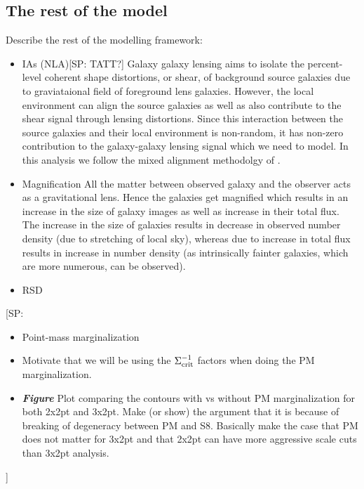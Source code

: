\documentclass[fleqn,usenatbib]{mnras}
\newcommand{\SP}[1]{{\color{red}[SP: #1]}}
\begin{document}
\subsection{The rest of the model}
\label{sec:full_pk_th}
Describe the rest of the modelling framework:
\begin{itemize}
    \item IAs (NLA)\SP{TATT?}
    Galaxy galaxy lensing aims to isolate the percent-level coherent shape distortions, or shear, of background source galaxies due to graviataional field of foreground lens galaxies. However, the local environment can align the source galaxies as well as also contribute to the shear signal through lensing distortions. Since this interaction between the source galaxies and their local environment is non-random, it has non-zero contribution to the galaxy-galaxy lensing signal which we need to model. In this analysis we follow the mixed alignment methodolgy of \cite{Blazek_2019}. 
    \item Magnification
    All the matter between observed galaxy and the observer acts as a gravitational lens. Hence the galaxies get magnified which results in an increase in the size of galaxy images as well as increase in their total flux. The increase in the size of galaxies results in decrease in observed number density (due to stretching of local sky), whereas due to increase in total flux results in increase in number density (as intrinsically fainter galaxies, which are more numerous, can be observed).  
    \item RSD
\end{itemize}    

    
    \SP{
    \begin{itemize}
    \item Point-mass marginalization 
    \item  Motivate that we will be using the $\Sigma^{-1}_{\rm crit}$ factors when doing the PM marginalization. 
    \item \textbf{\textit{Figure}} Plot comparing the contours with vs without PM marginalization for both 2x2pt and 3x2pt. Make (or show) the argument that it is because of breaking of degeneracy between PM and S8. Basically make the case that PM does not matter for 3x2pt and that 2x2pt can have more aggressive scale cuts than 3x2pt analysis.
    \end{itemize}
    }
    
\end{document}
